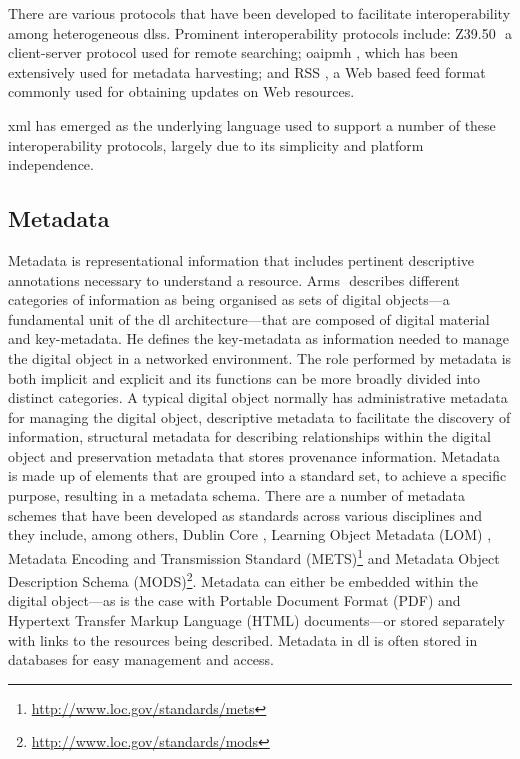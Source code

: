 There are various protocols that have been developed to facilitate interoperability among heterogeneous \glspl{dls}. Prominent interoperability protocols include: Z39.50 \citep{Lynch1994}⁠ a client-server protocol used for remote searching; \gls{oaipmh} \citep{Lagoze2002}⁠, which has been extensively used for metadata harvesting; and RSS \citep{Winer2007}⁠, a Web based feed format commonly used for obtaining updates on Web resources.

\gls{xml}  has emerged as the underlying language used to support a number of these interoperability protocols, largely due to its simplicity and platform independence.

\subsection{Metadata}
\label{sec:background:fundamental-concepts:metadata}

Metadata is representational information that includes pertinent descriptive annotations necessary to understand a resource. Arms \citep{Arms1997}⁠ describes different categories of information as being organised as sets of digital objects---a fundamental unit of the \gls{dl} architecture---that are composed of digital material and key-metadata. He defines the key-metadata as information needed to manage the digital object in a networked environment. The role performed by metadata is both implicit and explicit and its functions can be more broadly divided into distinct categories. A typical digital object normally has administrative metadata for managing the digital object, descriptive metadata to facilitate the discovery of information, structural metadata for describing relationships within  the digital object and preservation metadata that stores provenance information. Metadata is made up of elements that are grouped into a standard set, to achieve a specific purpose, resulting in a metadata schema. There are a number of metadata schemes that have been developed as standards across various disciplines and they include, among others, Dublin Core \citep{DCMI1999}⁠, Learning Object Metadata (LOM) \citep{IEEE2002}, Metadata Encoding and Transmission Standard (METS)\footnote{\url{http://www.loc.gov/standards/mets}} and Metadata Object Description Schema (MODS)\footnote{\url{http://www.loc.gov/standards/mods}}⁠. Metadata can either be embedded within the digital object---as is the case with Portable Document Format (PDF) and Hypertext Transfer Markup Language (HTML) documents---or stored separately with links to the resources being described. Metadata in \gls{dl}  is often stored in databases for easy management and access.

